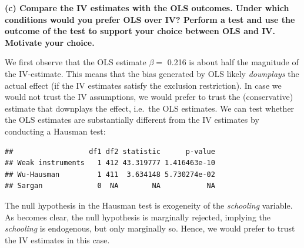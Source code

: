 \documentclass[
]{article}
\newenvironment{Shaded}{\begin{snugshade}}{\end{snugshade}}
\newcommand{\DataTypeTok}[1]{\textcolor[rgb]{0.13,0.29,0.53}{#1}}
\newcommand{\KeywordTok}[1]{\textcolor[rgb]{0.13,0.29,0.53}{\textbf{#1}}}
\newcommand{\NormalTok}[1]{#1}
\newcommand{\OperatorTok}[1]{\textcolor[rgb]{0.81,0.36,0.00}{\textbf{#1}}}
\newcommand{\OtherTok}[1]{\textcolor[rgb]{0.56,0.35,0.01}{#1}}
\newcommand{\StringTok}[1]{\textcolor[rgb]{0.31,0.60,0.02}{#1}}
\begin{document}
\textbf{(c) Compare the IV estimates with the OLS outcomes. Under which
conditions would you prefer OLS over IV? Perform a test and use the
outcome of the test to support your choice between OLS and IV. Motivate
your choice.}

We first observe that the OLS estimate \(\beta =\) 0.216 is about half
the magnitude of the IV-estimate. This means that the bias generated by
OLS likely \emph{downplays} the actual effect (if the IV estimates
satisfy the exclusion restriction). In case we would not trust the IV
assumptions, we would prefer to trust the (conservative) estimate that
downplays the effect, i.e.~the OLS estimates. We can test whether the
OLS estimates are substantially different from the IV estimates by
conducting a Hausman test:

\begin{Shaded}
\end{Shaded}

\begin{verbatim}
##                  df1 df2 statistic      p-value
## Weak instruments   1 412 43.319777 1.416463e-10
## Wu-Hausman         1 411  3.634148 5.730274e-02
## Sargan             0  NA        NA           NA
\end{verbatim}

The null hypothesis in the Hausman test is exogeneity of the
\emph{schooling} variable. As becomes clear, the null hypothesis is
marginally rejected, implying the \emph{schooling} is endogenous, but
only marginally so. Hence, we would prefer to trust the IV estimates in
this case.
\end{document}
